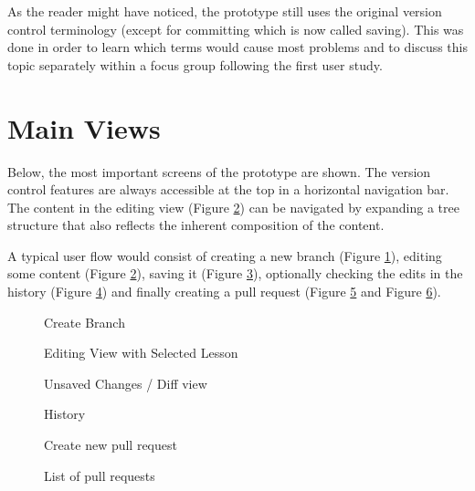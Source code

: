As the reader might have noticed, the prototype still uses the original version control terminology (except for committing which is now called saving). This was done in order to learn which terms would cause most problems and to discuss this topic separately within a focus group following the first user study.

\section{Main Views}
Below, the most important screens of the prototype are shown. The version control features are always accessible at the top in a horizontal navigation bar. The content in the editing view (Figure \ref{fig:prot-initial-editor-view}) can be navigated by expanding a tree structure that also reflects the inherent composition of the content. 

A typical user flow would consist of creating a new branch (Figure \ref{fig:create-branch}), editing some content (Figure \ref{fig:prot-initial-editor-view}), saving it (Figure \ref{fig:unsaved-changes}), optionally checking the edits in the history (Figure \ref{fig:history}) and finally creating a pull request (Figure \ref{fig:open-new-pr} and Figure \ref{fig:list-of-prs}). 

\begin{figure}[h!]
 \centering
 \caption{Create Branch}
 \label{fig:create-branch}
\end{figure}


\begin{figure}[h!]
 \centering
 \caption{Editing View with Selected Lesson}
 \label{fig:prot-initial-editor-view}
\end{figure}

\begin{figure}[h!]
 \centering
 \caption{Unsaved Changes / Diff view}
 \label{fig:unsaved-changes}
\end{figure}

\begin{figure}[h!]
 \centering
 \caption{History}
 \label{fig:history}
\end{figure}

\begin{figure}[h!]
 \centering
 \caption{Create new pull request}
 \label{fig:open-new-pr}
\end{figure}

\begin{figure}[h!]
 \centering
 \caption{List of pull requests}
 \label{fig:list-of-prs}
\end{figure}